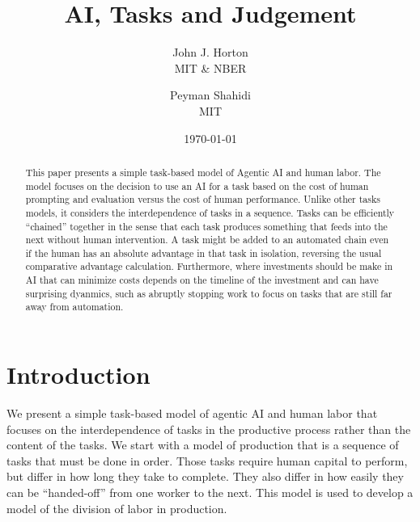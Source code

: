 \documentclass{article}
\theoremstyle{plain}
\theoremstyle{plain}
\begin{document}
\title{AI, Tasks and Judgement}
\author{\normalsize John J. Horton  \\ \normalsize MIT \& NBER  \and \normalsize Peyman Shahidi \\  \normalsize MIT}
\date{\today{}}



\newcommand{\machine}[1]{\langle #1 \rangle}
\newcommand{\human}[1]{( #1 )}
\newcommand{\cost}[1]{C\{ #1 \}}
\newcommand{\costdo}[1]{C_H\{ #1 \}}
\newcommand{\costmanage}[1]{C_M\{ #1 \}}
\newcommand{\tasktime}[1]{t_{#1}}
\newcommand{\taskhc}[1]{c_{#1}}
\newcommand{\labor}[1]{l_{#1}}

\newcommand{\topic}[1]{\paragraph{#1}}

\maketitle

\begin{abstract}
\noindent This paper presents a simple task-based model of Agentic AI and human labor.
The model focuses on the decision to use an AI for a task based on the cost of human prompting and evaluation versus the cost of human performance. 
Unlike other tasks models, it considers the interdependence of tasks in a sequence. 
Tasks can be efficiently ``chained'' together in the sense that each task produces something that feeds into the next without human intervention.
A task might be added to an automated chain even if the human has an absolute advantage in that task in isolation, reversing the usual comparative advantage calculation.
Furthermore, where investments should be make in AI that can minimize costs depends on the timeline of the investment and can have surprising dyanmics, such as abruptly stopping work to focus on tasks that are still far away from automation.
\end{abstract}

\onehalfspacing
  
\section{Introduction}
We present a simple task-based model of agentic AI and human labor that focuses on the interdependence of tasks in the productive process rather than the content of the tasks.
We start with a model of production that is a sequence of tasks that must be done in order.
Those tasks require human capital to perform, but differ in how long they take to complete.
They also differ in how easily they can be ``handed-off'' from one worker to the next.
This model is used to develop a model of the division of labor in production.
\end{document}
